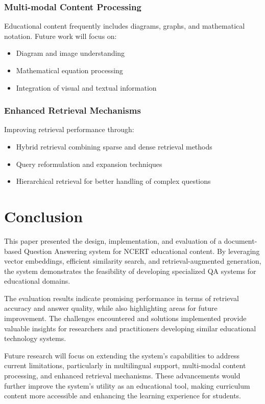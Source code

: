 \documentclass[10pt,conference]{IEEEtran}
\begin{document}
\subsubsection{Multi-modal Content Processing}
Educational content frequently includes diagrams, graphs, and mathematical notation. Future work will focus on:
\begin{itemize}
    \item Diagram and image understanding
    \item Mathematical equation processing
    \item Integration of visual and textual information
\end{itemize}

\subsubsection{Enhanced Retrieval Mechanisms}
Improving retrieval performance through:
\begin{itemize}
    \item Hybrid retrieval combining sparse and dense retrieval methods
    \item Query reformulation and expansion techniques
    \item Hierarchical retrieval for better handling of complex questions
\end{itemize}

\section{Conclusion}
This paper presented the design, implementation, and evaluation of a document-based Question Answering system for NCERT educational content. By leveraging vector embeddings, efficient similarity search, and retrieval-augmented generation, the system demonstrates the feasibility of developing specialized QA systems for educational domains.

The evaluation results indicate promising performance in terms of retrieval accuracy and answer quality, while also highlighting areas for future improvement. The challenges encountered and solutions implemented provide valuable insights for researchers and practitioners developing similar educational technology systems.

Future research will focus on extending the system's capabilities to address current limitations, particularly in multilingual support, multi-modal content processing, and enhanced retrieval mechanisms. These advancements would further improve the system's utility as an educational tool, making curriculum content more accessible and enhancing the learning experience for students.
\end{document}
